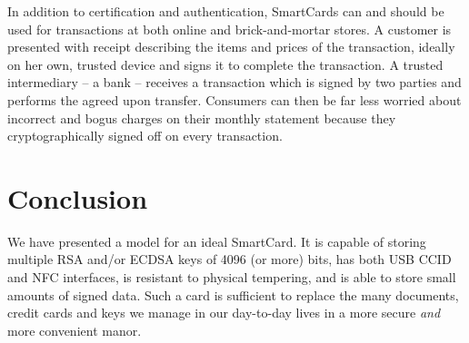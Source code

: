 \documentclass[11pt, twocolumn]{article}
\begin{document}
In addition to certification and authentication, SmartCards can and should be
used for transactions at both online and brick-and-mortar stores. A customer is
presented with receipt describing the items and prices of the transaction,
ideally on her own, trusted device and signs it to complete the transaction. A
trusted intermediary -- a bank -- receives a transaction which is signed by two
parties and performs the agreed upon transfer. Consumers can then be far less
worried about incorrect and bogus charges on their monthly statement because
they cryptographically signed off on every transaction.

\section{Conclusion}
\label{sec:conclusion}

We have presented a model for an ideal SmartCard. It is capable of storing
multiple RSA and/or ECDSA keys of 4096 (or more) bits, has both USB CCID and
NFC interfaces, is resistant to physical tempering, and is able to store small
amounts of signed data. Such a card is sufficient to replace the many documents,
credit cards and keys we manage in our day-to-day lives in a more secure
\textit{and} more convenient manor.



\end{document}
